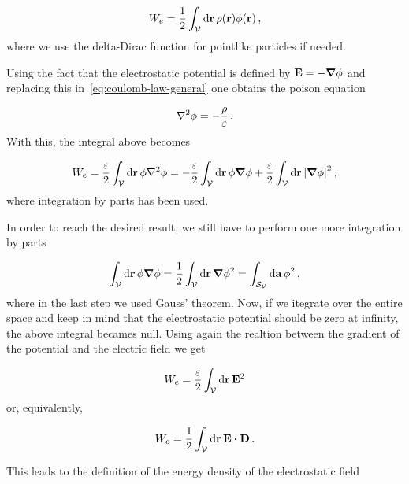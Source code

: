 \documentclass[12pt, class=report, crop=false]{standalone}
\begin{document}
\begin{equation*}
  W_{e} = \frac{1}{2} \int_\mathcal{V} \dd{\vb{r}} \rho (\vb{r}) \phi (\vb{r}) \, ,
\end{equation*}
where we use the delta-Dirac function for pointlike particles if needed.

\par
Using the fact that the electrostatic potential is defined by \(\vb{E} = - \grad{\phi}\) and replacing this in~\cref{eq:coulomb-law-general} one obtains the poison equation

\begin{equation}
 \label{eq:poisson}
 \laplacian{\phi} = - \frac{\rho}{\varepsilon} \,.
\end{equation}
With this, the integral above becomes

\begin{equation*}
  W_{e} = \frac{\varepsilon}{2} \int_\mathcal{V} \dd{\vb{r}} \phi \laplacian{\phi} = - \frac{\varepsilon}{2} \int_\mathcal{V} \dd{\vb{r}} \phi \grad{\phi} + \frac{\varepsilon}{2} \int_\mathcal{V} \dd{\vb{r}} \abs{\grad{\phi}}^{2} \, ,
\end{equation*}
where integration by parts has been used.

\par
In order to reach the desired result, we still have to perform one more integration by parts

\begin{equation*}
  \int_\mathcal{V} \dd{\vb{r}} \phi \grad{\phi} = \frac{1}{2} \int_\mathcal{V} \dd{\vb{r}} \grad{\phi^2} = \int_{\mathcal{S}_{\mathcal{V}}} \dd{\vb{a}} \phi^{2} \, ,
\end{equation*}
where in the last step we used Gauss' theorem. Now, if we itegrate over the entire space and keep in mind that the electrostatic potential should be zero at infinity, the above integral becames null. Using again the realtion between the gradient of the potential and the electric field we get

\begin{equation}
  W_{e} = \frac{\varepsilon}{2} \int_\mathcal{V} \dd{\vb{r}} \vb{E}^{2}
\end{equation}
or, equivalently,

\begin{equation}
  W_{e} = \frac{1}{2} \int_\mathcal{V} \dd{\vb{r}} \vb{E} \vdot \vb{D} \,.
\end{equation}

\par
This leads to the definition of the energy density of the electrostatic field
\end{document}

